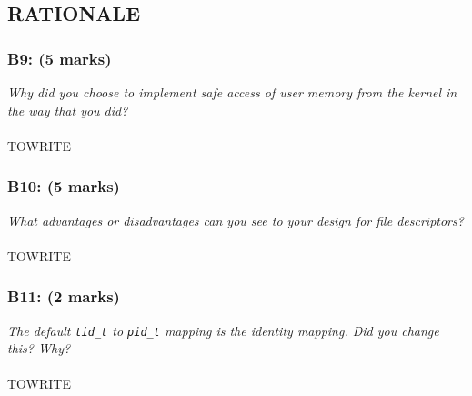 \documentclass[a4paper,12pt]{article}
\begin{document}
\subsection{RATIONALE}

\subsubsection*{B9: (5 marks) }
\textit{Why did you choose to implement safe access of user memory from the
kernel in the way that you did?}
\\ \\ TOWRITE

\subsubsection*{B10: (5 marks) }
\textit{What advantages or disadvantages can you see to your design for file
descriptors?}
\\ \\ TOWRITE

\subsubsection*{B11: (2 marks) }
\textit{The default \texttt{tid\_t} to \texttt{pid\_t} mapping is the identity mapping. Did you
change this? Why?}
\\ \\ TOWRITE
\end{document}
